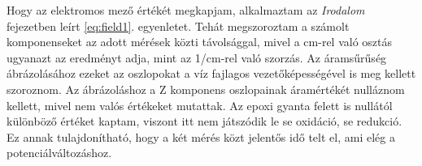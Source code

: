 Hogy az elektromos mező értékét megkapjam, alkalmaztam az \emph{Irodalom} fejezetben leírt \ref{eq:field1}. egyenletet. Tehát megszoroztam a számolt komponenseket az adott mérések közti távolsággal, mivel a cm-rel való osztás ugyanazt az eredményt adja, mint az 1/cm-rel való szorzás. Az áramsűrűség ábrázolásához ezeket az oszlopokat a víz fajlagos vezetőképességével is meg kellett szoroznom. Az ábrázoláshoz a Z komponens oszlopainak áramértékét nulláznom kellett, mivel nem valós értékeket mutattak. Az epoxi gyanta felett is nullától különböző értéket kaptam, viszont itt nem játszódik le se oxidáció, se redukció. Ez annak tulajdonítható, hogy a két mérés közt jelentős idő telt el, ami elég a potenciálváltozáshoz.
